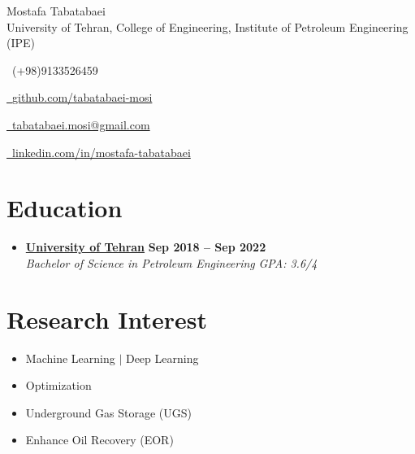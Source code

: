 \documentclass[a4paper, 11pt, sans]{article}
\newcommand{\resumeSubheadingmosi}[4]{
	\vspace{-1pt}\item
	\textbf{#1} \hfill \textbf{\small #2} \\
	\textit{\small#3} \hfill \textit{\small #4} \\
	\vspace{2pt}
}
\newcommand{\resumeSubHeadingListStart}{\begin{itemize}[leftmargin=0.0in, label={}]}
\newcommand{\resumeSubHeadingListEnd}{\end{itemize}}
\newcommand*{\authorimg}[1]{%
	\raisebox{-.3\baselineskip}{%
		\texttt{[image: \#1]}%
	}%
}
\begin{document}
	
	\begin{center}
		
		{\Huge Mostafa Tabatabaei} \\ \vspace{2pt} 
		University of Tehran, College of Engineering, Institute of Petroleum Engineering (IPE)
		\vspace{5pt}
		
		\begin{multicols}{2}
			\small \raisebox{-0.1\height}\faPhone\ (+98)9133526459 ~ 
			
			\href{https://github.com/tabatabaei-mosi}{\raisebox{-0.2\baselineskip}\faGithub\ {github.com/tabatabaei-mosi}}
			
			\href{mailto:tabatabaei.mosi@gmail.com}{\raisebox{-0.2\height}\faEnvelope\  {tabatabaei.mosi@gmail.com}} ~
			
			\href{https://www.linkedin.com/in/mostafa-tabatabaei-33250519a?lipi=urn%3Ali%3Apage%3Ad_flagship3_profile_view_base_contact_details%3BqGy0Rh1ZRaibu4R%2FFDrLiQ%3D%3D}{\raisebox{-0.2\baselineskip}\faLinkedin\ {linkedin.com/in/mostafa-tabatabaei}}  ~
			
			\vspace{-8pt}
		\end{multicols}
	\end{center}
	
	
\section{Education}
	\resumeSubHeadingListStart
	\resumeSubheadingmosi
	{\authorimg{images/UT.png} \href{https://www.ut.ac.ir/en}{University of Tehran}}{Sep 2018 -- Sep 2022}
	{\hspace{0.65cm}Bachelor of Science in Petroleum Engineering}{GPA: 3.6/4}
	\resumeSubHeadingListEnd
	
	
	
\section{Research Interest}
	 \begin{multicols}{2}
		\begin{itemize}[itemsep=-2pt, parsep=3pt]
			\item \small Machine Learning $|$ Deep Learning 
			\item \small Optimization
			\item \small Underground Gas Storage (UGS)
			\item \small Enhance Oil Recovery (EOR)
		\end{itemize}
		 \end{multicols}
	
\end{document}
